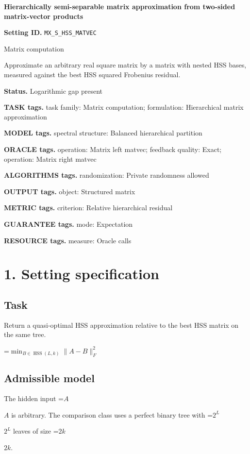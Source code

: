 \documentclass[10pt,a4paper]{article}
\newcommand{\AtlasMath}[1]{\par\begingroup\centering\setbox0=\hbox{$\displaystyle #1$}\ifdim\wd0>1.4\linewidth\typeout{ATLAS WIDE FORMULA: \the\wd0}\fi\ifdim\wd0>\linewidth\resizebox{\linewidth}{!}{\box0}\else\box0\fi\par\endgroup}
\newcommand{\AtlasInlineMath}[1]{\begingroup\setbox0=\hbox{$#1$}\ifdim\wd0>.4\linewidth\endgroup\AtlasMath{#1}\else\endgroup$#1$\fi}
\begin{document}
\raggedright

{\LARGE\bfseries\sffamily\color{AtlasNavy} Hierarchically semi-separable matrix approximation from two-sided matrix-vector products\par}\vspace{5pt}
\textbf{Setting ID.} \texttt{MX\_\allowbreak{}S\_\allowbreak{}HSS\_\allowbreak{}MATVEC}

Matrix computation

Approximate an arbitrary real square matrix by a matrix with nested HSS bases, measured against the best HSS squared Frobenius residual.

\textbf{Status.} Logarithmic gap present

\textbf{TASK tags.} task family: Matrix computation; formulation: Hierarchical matrix approximation

\textbf{MODEL tags.} spectral structure: Balanced hierarchical partition

\textbf{ORACLE tags.} operation: Matrix left matvec; feedback quality: Exact; operation: Matrix right matvec

\textbf{ALGORITHMS tags.} randomization: Private randomness allowed

\textbf{OUTPUT tags.} object: Structured matrix

\textbf{METRIC tags.} criterion: Relative hierarchical residual

\textbf{GUARANTEE tags.} mode: Expectation

\textbf{RESOURCE tags.} measure: Oracle calls

\section{1. Setting specification}
\subsection{Task}
Return a quasi-optimal HSS approximation relative to the best HSS matrix on the same tree.


\AtlasMath{\min_{B\in\operatorname{HSS}(L,k)} \|A-B\|_F^2}


\subsection{Admissible model}
The hidden input \AtlasInlineMath{A} is arbitrary. The comparison class uses a perfect binary tree with \AtlasInlineMath{2^L} leaves of size \AtlasInlineMath{2k}.
\end{document}
